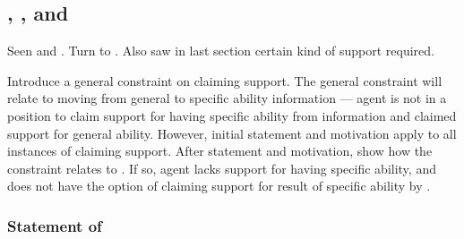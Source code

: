 \subsection{\nI{}, \gsi{}, and \AR{}}
\label{sec:second-conditional}

\begin{note}
  Seen \ESU{} and \WR{}.
  Turn to \AR{}.
  Also saw in last section certain kind of support required.

  Introduce a general constraint on claiming support.
  The general constraint will relate to moving from general to specific ability information --- agent is not in a position to claim support for having specific ability from information and claimed support for general ability.
  However, initial statement and motivation apply to all instances of claiming support.
  After statement and motivation, show how the constraint relates to \AR{}.
  If so, agent lacks support for having specific ability, and does not have the option of claiming support for result of specific ability by \AR{}.
\end{note}

\subsubsection{Statement of \nI{}}
\label{sec:ni-1}


